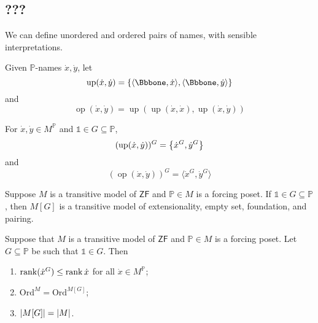 \subsection{???}
We can define unordered and ordered pairs of names, with sensible interpretations.
\begin{definition}
    Given \( \mathbb P \)-names \( \dot x, \dot y \), let
    \[ \operatorname{up}(\dot x, \dot y) = \qty{\langle \Bbbone, \dot x \rangle, \langle \Bbbone, \dot y \rangle} \]
    and
    \[ \operatorname{op}(\dot x, \dot y) = \operatorname{up}(\operatorname{up}(\dot x, \dot x), \operatorname{up}(\dot x, \dot y)) \]
\end{definition}
\begin{proposition}
    For \( \dot x, \dot y \in M^{\mathbb P} \) and \( \Bbbone \in G \subseteq \mathbb P \),
    \[ (\operatorname{up}(\dot x, \dot y))^G = \qty{\dot x^G, \dot y^G} \]
    and
    \[ (\operatorname{op}(\dot x, \dot y))^G = \langle \dot x^G, \dot y^G \rangle \]
\end{proposition}
\begin{lemma}
    Suppose \( M \) is a transitive model of \( \mathsf{ZF} \) and \( \mathbb P \in M \) is a forcing poset.
    If \( \Bbbone \in G \subseteq \mathbb P \), then \( M[G] \) is a transitive model of extensionality, empty set, foundation, and pairing.
\end{lemma}
\begin{lemma}
    Suppose that \( M \) is a transitive model of \( \mathsf{ZF} \) and \( \mathbb P \in M \) is a forcing poset.
    Let \( G \subseteq \mathbb P \) be such that \( \Bbbone \in G \).
    Then
    \begin{enumerate}
        \item \( \rank (\dot x^G) \leq \rank \dot x \) for all \( \dot x \in M^{\mathbb P} \);
        \item \( \mathrm{Ord}^M = \mathrm{Ord}^{M[G]} \);
        \item \( \abs{M[G]} = \abs{M} \).
    \end{enumerate}
\end{lemma}
